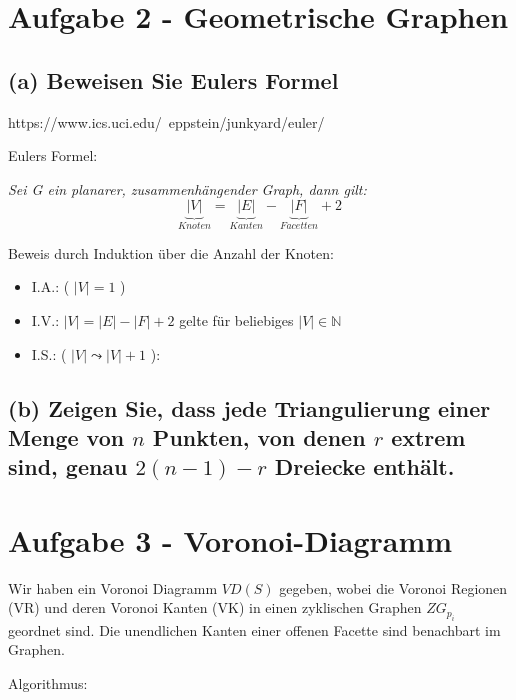 \documentclass[a4paper]{article}
\begin{document}
\section*{Aufgabe 2 - Geometrische Graphen}

\subsection*{(a) Beweisen Sie Eulers Formel}

https://www.ics.uci.edu/~eppstein/junkyard/euler/

Eulers Formel:

\textit{Sei G ein planarer, zusammenhängender Graph, dann gilt:}
 $$\underbrace{|V|}_{Knoten} = \underbrace{|E|}_{Kanten} - \underbrace{|F|}_{Facetten} + 2 $$

Beweis durch Induktion über die Anzahl der Knoten:

\begin{itemize}
  \item I.A.: ( $|V| = 1$ )
  \item I.V.: $|V| = |E| - |F| + 2 $ gelte für beliebiges $|V| \in \mathbb{N}$ 
  \item I.S.: ( $|V| \leadsto |V| + 1$ ):  
\end{itemize}

\subsection*{(b) Zeigen Sie, dass jede Triangulierung einer Menge von $n$ Punkten, von denen $r$ extrem sind, genau $2 (n - 1) - r$ Dreiecke enthält.}



\section*{Aufgabe 3 - Voronoi-Diagramm}


Wir haben ein Voronoi Diagramm $VD(S)$ gegeben, wobei die Voronoi Regionen (VR) und deren Voronoi Kanten (VK) in einen zyklischen Graphen $ZG_{p_i}$ geordnet sind. Die unendlichen Kanten einer offenen Facette sind benachbart im Graphen. 

Algorithmus:
\end{document}
